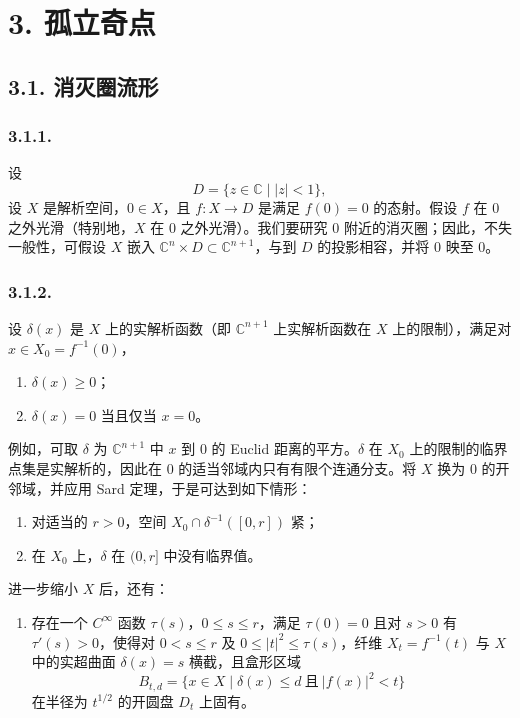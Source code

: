 \section*{3. 孤立奇点}

\subsection*{3.1. 消灭圈流形}

\subsubsection*{3.1.1.}
设
\[
D=\{z\in\mathbb C\mid |z|<1\},
\]
设 $X$ 是解析空间，$0\in X$，且 $f:X\to D$ 是满足 $f(0)=0$ 的态射。假设 $f$ 在 $0$ 之外光滑（特别地，$X$ 在 $0$ 之外光滑）。我们要研究 $0$ 附近的消灭圈；因此，不失一般性，可假设 $X$ 嵌入 $\mathbb C^n\times D\subset\mathbb C^{n+1}$，与到 $D$ 的投影相容，并将 $0$ 映至 $0$。

\subsubsection*{3.1.2.}
设 $\delta(x)$ 是 $X$ 上的实解析函数（即 $\mathbb C^{n+1}$ 上实解析函数在 $X$ 上的限制），满足对 $x\in X_0=f^{-1}(0)$，

\begin{enumerate}[label=(\alph*)]
\item $\delta(x)\geq 0$；
\item $\delta(x)=0$ 当且仅当 $x=0$。
\end{enumerate}

例如，可取 $\delta$ 为 $\mathbb C^{n+1}$ 中 $x$ 到 $0$ 的 Euclid 距离的平方。$\delta$ 在 $X_0$ 上的限制的临界点集是实解析的，因此在 $0$ 的适当邻域内只有有限个连通分支。将 $X$ 换为 $0$ 的开邻域，并应用 Sard 定理，于是可达到如下情形：

\begin{enumerate}[label=(\alph*),start=3]
\item 对适当的 $r>0$，空间 $X_0\cap\delta^{-1}([0,r])$ 紧；
\item 在 $X_0$ 上，$\delta$ 在 $(0,r]$ 中没有临界值。
\end{enumerate}

进一步缩小 $X$ 后，还有：

\begin{enumerate}[label=(\alph*),start=5]
\item 存在一个 $C^\infty$ 函数 $\tau(s)$，$0\leq s\leq r$，满足 $\tau(0)=0$ 且对 $s>0$ 有 $\tau'(s)>0$，使得对 $0<s\leq r$ 及 $0\leq |t|^2\leq\tau(s)$，纤维 $X_t=f^{-1}(t)$ 与 $X$ 中的实超曲面 $\delta(x)=s$ 横截，且盒形区域
\[
  B_{t,d}=\{x\in X\mid \delta(x)\leq d\ \text{且}\ |f(x)|^2<t\}
  \]
在半径为 $t^{1/2}$ 的开圆盘 $D_t$ 上固有。
\end{enumerate}

